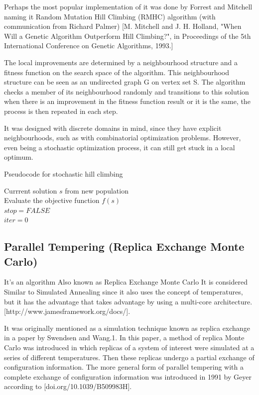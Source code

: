 Perhaps the most popular implementation of it was done by Forrest and Mitchell naming it Random Mutation Hill Climbing (RMHC) algorithm (with communication from Richard Palmer) [M. Mitchell and J. H. Holland, "When Will a Genetic Algorithm Outperform Hill Climbing?", in Proceedings of the 5th International Conference on Genetic Algorithms, 1993.]

The local improvements are determined by a neighbourhood structure and a fitness function on the search space of the algorithm. This neighbourhood structure can be seen as an undirected graph G on vertex set S. The algorithm checks a member of its neighbourhood randomly and transitions to this solution when there is an improvement in the fitness function result or it is the same, the process is then repeated in each step.

It was designed with discrete domains in mind, since they have explicit neighbourhoods, such as with combinatorial optimization problems. However, even being a stochastic optimization process, it can still get stuck in a local optimum.

\begin{algorithm}[H]
\label{evolution_alg}
\caption{Pseudocode for stochastic hill climbing}
\SetAlgoLined
    Currrent solution $s$ from new population\;\\
    Evaluate the objective function $f(s)$\;\\
    $stop = \textit{FALSE}$\;\\
    $iter = 0$\;\\
\end{algorithm}

\subsection{Parallel Tempering (Replica Exchange Monte Carlo)} 

It's an algorithm Also known as Replica Exchange Monte Carlo It is considered Similar to Simulated Annealing since it also uses the concept of temperatures, but it has the advantage that takes advantage by using a multi-core architecture. [http://www.jamesframework.org/docs/].

It was originally mentioned as a simulation technique known as replica exchange in a paper by Swendsen and Wang.1. In this paper, a method of replica Monte Carlo was introduced in which replicas of a system of interest were simulated at a series of different temperatures. Then these replicas undergo a partial exchange of configuration information. The more general form of parallel tempering with a complete exchange of configuration information was introduced in 1991 by Geyer according to [doi.org/10.1039/B509983H].

